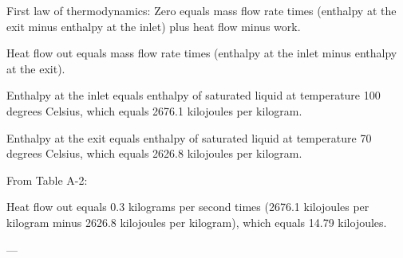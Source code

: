 First law of thermodynamics:  
Zero equals mass flow rate times (enthalpy at the exit minus enthalpy at the inlet) plus heat flow minus work.  

Heat flow out equals mass flow rate times (enthalpy at the inlet minus enthalpy at the exit).  

Enthalpy at the inlet equals enthalpy of saturated liquid at temperature 100 degrees Celsius, which equals 2676.1 kilojoules per kilogram.  

Enthalpy at the exit equals enthalpy of saturated liquid at temperature 70 degrees Celsius, which equals 2626.8 kilojoules per kilogram.  

From Table A-2:  

Heat flow out equals 0.3 kilograms per second times (2676.1 kilojoules per kilogram minus 2626.8 kilojoules per kilogram), which equals 14.79 kilojoules.  

---